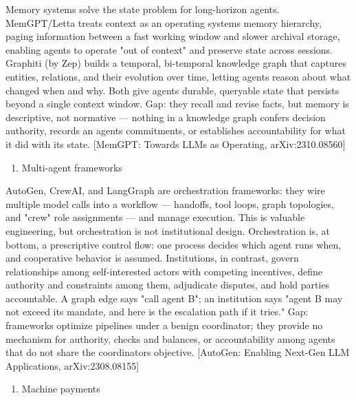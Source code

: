 \documentclass[
]{article}
\providecommand{\tightlist}{%
  \setlength{\itemsep}{0pt}\setlength{\parskip}{0pt}}
\begin{document}
Memory systems solve the state problem for long-horizon agents.
MemGPT/Letta treats context as an operating system\textquotesingle s
memory hierarchy, paging information between a fast working window and
slower archival storage, enabling agents to operate "out of context" and
preserve state across sessions. Graphiti (by Zep) builds a temporal,
bi-temporal knowledge graph that captures entities, relations, and their
evolution over time, letting agents reason about what changed when and
why. Both give agents durable, queryable state that persists beyond a
single context window. Gap: they recall and revise facts, but memory is
descriptive, not normative --- nothing in a knowledge graph confers
decision authority, records an agent\textquotesingle s commitments, or
establishes accountability for what it did with its state. {[}MemGPT:
Towards LLMs as Operating, arXiv:2310.08560{]}

\begin{enumerate}
\def\labelenumi{\arabic{enumi}.}
\setcounter{enumi}{4}
\tightlist
\item
  Multi-agent frameworks
\end{enumerate}

AutoGen, CrewAI, and LangGraph are orchestration frameworks: they wire
multiple model calls into a workflow --- handoffs, tool loops, graph
topologies, and "crew" role assignments --- and manage execution. This
is valuable engineering, but orchestration is not institutional design.
Orchestration is, at bottom, a prescriptive control flow: one process
decides which agent runs when, and cooperative behavior is assumed.
Institutions, in contrast, govern relationships among self-interested
actors with competing incentives, define authority and constraints among
them, adjudicate disputes, and hold parties accountable. A graph edge
says "call agent B"; an institution says "agent B may not exceed its
mandate, and here is the escalation path if it tries." Gap: frameworks
optimize pipelines under a benign coordinator; they provide no mechanism
for authority, checks and balances, or accountability among agents that
do not share the coordinator\textquotesingle s objective. {[}AutoGen:
Enabling Next-Gen LLM Applications, arXiv:2308.08155{]}

\begin{enumerate}
\def\labelenumi{\arabic{enumi}.}
\setcounter{enumi}{5}
\tightlist
\item
  Machine payments
\end{enumerate}
\end{document}
